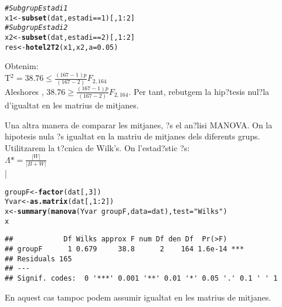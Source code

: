 \documentclass[a4paper,titlepage,12pt]{article}\usepackage[]{graphicx}\usepackage[]{color}
\makeatletter
\newcommand{\hlnum}[1]{\textcolor[rgb]{0.686,0.059,0.569}{#1}}%
\newcommand{\hlstr}[1]{\textcolor[rgb]{0.192,0.494,0.8}{#1}}%
\newcommand{\hlcom}[1]{\textcolor[rgb]{0.678,0.584,0.686}{\textit{#1}}}%
\newcommand{\hlopt}[1]{\textcolor[rgb]{0,0,0}{#1}}%
\newcommand{\hlstd}[1]{\textcolor[rgb]{0.345,0.345,0.345}{#1}}%
\newcommand{\hlkwb}[1]{\textcolor[rgb]{0.69,0.353,0.396}{#1}}%
\newcommand{\hlkwc}[1]{\textcolor[rgb]{0.333,0.667,0.333}{#1}}%
\newcommand{\hlkwd}[1]{\textcolor[rgb]{0.737,0.353,0.396}{\textbf{#1}}}%
\newenvironment{kframe}{%
 \def\at@end@of@kframe{}%
 \ifinner\ifhmode%
  \def\at@end@of@kframe{\end{minipage}}%
  \begin{minipage}{\columnwidth}%
 \fi\fi%
 \def\FrameCommand##1{\hskip\@totalleftmargin \hskip-\fboxsep
 \colorbox{shadecolor}{##1}\hskip-\fboxsep
     \hskip-\linewidth \hskip-\@totalleftmargin \hskip\columnwidth}%
 \MakeFramed {\advance\hsize-\width
   \@totalleftmargin\z@ \linewidth\hsize
   \@setminipage}}%
 {\par\unskip\endMakeFramed%
 \at@end@of@kframe}
\newenvironment{knitrout}{}{} %
\makeatother
\begin{document}
\begin{knitrout}
\begin{kframe}
\begin{alltt}
\hlcom{# Subgrup Estadi 1}
\hlstd{x1} \hlkwb{<-} \hlkwd{subset}\hlstd{(dat, estadi} \hlopt{==} \hlnum{1}\hlstd{)[,} \hlnum{1}\hlopt{:}\hlnum{2}\hlstd{]}
\hlcom{# Subgrup Estadi 2}
\hlstd{x2} \hlkwb{<-} \hlkwd{subset}\hlstd{(dat, estadi} \hlopt{==} \hlnum{2}\hlstd{)[,} \hlnum{1}\hlopt{:}\hlnum{2}\hlstd{]}
\hlstd{res} \hlkwb{<-} \hlkwd{hotel2T2}\hlstd{(x1, x2,} \hlkwc{a} \hlstd{=} \hlnum{0.05}\hlstd{)}
\end{alltt}
\end{kframe}
\end{knitrout}


Obtenim:
\\
T$^{2}= 38.76 \leq \frac{(167-1)p}{(167-2)}F_{2,164}$
\\
Aleshores ,
38.76$\geq \frac{(167-1)p}{(167-2)}F_{2,164}$. Per tant, rebutgem la hip?tesis nul?la d'igualtat en les matrius de mitjanes.

Una altra manera de comparar les mitjanes, ?s el an?lisi MANOVA. On la hipotesis nula ?s igualtat en la matriu de mitjanes dels diferents grups.
\\
Utilitzarem la t?cnica de Wilk's. On l'estad?stic ?s:
\\
$\Lambda *=\frac{\left | W \right |}{\left | B+W \right |}$
\\
\right |
\begin{knitrout}
\color{fgcolor}\begin{kframe}
\begin{alltt}
\hlstd{groupF} \hlkwb{<-} \hlkwd{factor}\hlstd{(dat[,} \hlnum{3}\hlstd{])}
\hlstd{Yvar} \hlkwb{<-} \hlkwd{as.matrix}\hlstd{(dat[,} \hlnum{1}\hlopt{:}\hlnum{2}\hlstd{])}
\hlstd{x} \hlkwb{<-} \hlkwd{summary}\hlstd{(}\hlkwd{manova}\hlstd{(Yvar} \hlopt{~} \hlstd{groupF,} \hlkwc{data} \hlstd{= dat),} \hlkwc{test} \hlstd{=} \hlstr{"Wilks"}\hlstd{)}
\hlstd{x}
\end{alltt}
\begin{verbatim}
##            Df Wilks approx F num Df den Df  Pr(>F)    
## groupF      1 0.679     38.8      2    164 1.6e-14 ***
## Residuals 165                                         
## ---
## Signif. codes:  0 '***' 0.001 '**' 0.01 '*' 0.05 '.' 0.1 ' ' 1
\end{verbatim}
\end{kframe}
\end{knitrout}


En aquest cas tampoc podem assumir igualtat en les matrius de mitjanes.
\end{document}
